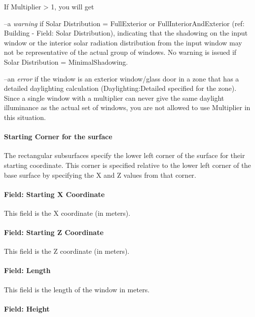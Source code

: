 If Multiplier \textgreater{} 1, you will get

--a \emph{warning} if Solar Distribution = FullExterior or FullInteriorAndExterior (ref: Building - Field: Solar Distribution), indicating that the shadowing on the input window or the interior solar radiation distribution from the input window may not be representative of the actual group of windows. No warning is issued if Solar Distribution = MinimalShadowing.

--an \emph{error} if the window is an exterior window/glass door in a zone that has a detailed daylighting calculation (Daylighting:Detailed specified for the zone). Since a single window with a multiplier can never give the same daylight illuminance as the actual set of windows, you are not allowed to use Multiplier in this situation.

\paragraph{Starting Corner for the surface}\label{starting-corner-for-the-surface-13}

The rectangular subsurfaces specify the lower left corner of the surface for their starting coordinate. This corner is specified relative to the lower left corner of the base surface by specifying the X and Z values from that corner.

\paragraph{Field: Starting X Coordinate}\label{field-starting-x-coordinate-13}

This field is the X coordinate (in meters).

\paragraph{Field: Starting Z Coordinate}\label{field-starting-z-coordinate-13}

This field is the Z coordinate (in meters).

\paragraph{Field: Length}\label{field-length-13}

This field is the length of the window in meters.

\paragraph{Field: Height}\label{field-height-7}

